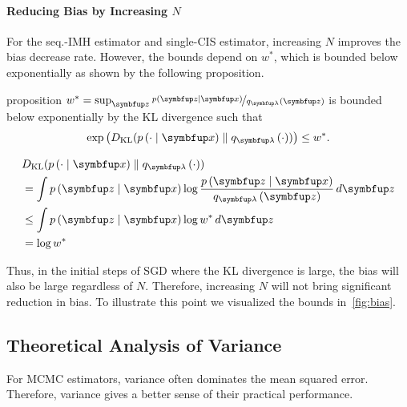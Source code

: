 \paragraph{Reducing Bias by Increasing \(N\)}
For the seq.-IMH estimator and single-CIS estimator, increasing \(N\) improves the bias decrease rate.
However, the bounds depend on \(w^*\), which is bounded below exponentially as shown by the following proposition.
%
\begin{theoremEnd}{proposition}\label{thm:kl_bound}
  \(w^* = \sup_{\vz} \nicefrac{p\left(\vz\mid\vx\right)}{q_{\vlambda}\left(\vz\right)} \) is bounded below exponentially by the KL divergence such that
  \[
  \exp\left(\DKL{p\left(\cdot\mid\vx\right)}{ q_{\vlambda}\left(\cdot\right) }\right) \leq w^*.
  \]
\end{theoremEnd}
\begin{proofEnd}
  \begin{align}
    &\DKL{p\left(\cdot\mid\vx\right)}{ q_{\vlambda}\left(\cdot\right) } \\
    &= \int p\left(\vz\mid\vx\right) \log \frac{p\left(\vz\mid\vx\right)}{q_{\vlambda}\left(\vz\right)}\,d\vz \\
    &\leq \int p\left(\vz\mid\vx\right) \log w^* \, d\vz \\
    &= \log w^*
  \end{align}
\end{proofEnd}

Thus, in the initial steps of SGD where the KL divergence is large, the bias will also be large regardless of \(N\).
Therefore, increasing \(N\) will not bring significant reduction in bias.
To illustrate this point we visualized the bounds in~\cref{fig:bias}.

\vspace{-0.05in}
\subsection{Theoretical Analysis of Variance}
For MCMC estimators, variance often dominates the mean squared error.
Therefore, variance gives a better sense of their practical performance.

\vspace{-0.05in}
